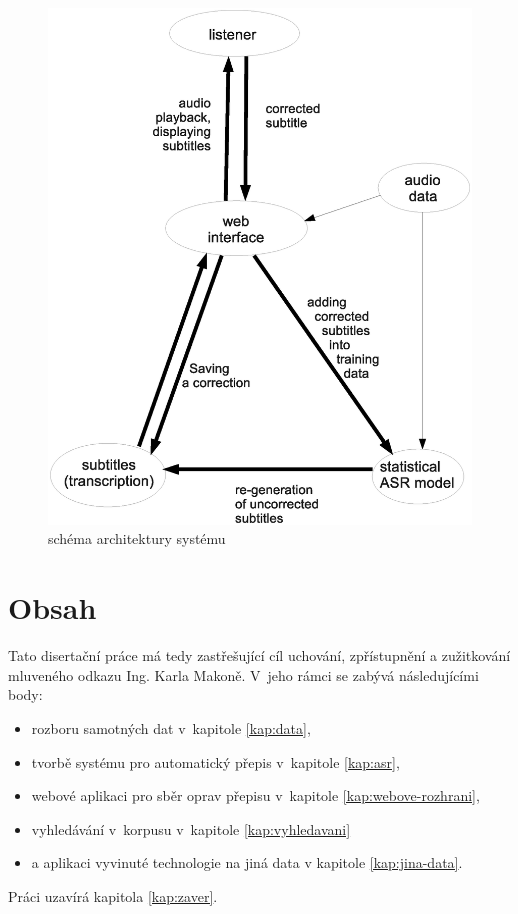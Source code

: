 \begin{figure}[htpb]
\includegraphics[scale=0.6]{rc/arch.eps}
\caption{schéma architektury systému}
\label{fig:arch}
\end{figure}

\section{Obsah}

Tato disertační práce má tedy zastřešující cíl uchování, zpřístupnění a
zužitkování mluveného odkazu Ing. Karla Makoně. V~jeho rámci se zabývá
následujícími body:

\begin{itemize}
\item{rozboru samotných dat v~kapitole \ref{kap:data},}
\item{tvorbě systému pro automatický přepis v~kapitole \ref{kap:asr},}
\item{webové aplikaci pro sběr oprav přepisu v~kapitole \ref{kap:webove-rozhrani},}
\item{vyhledávání v~korpusu v~kapitole \ref{kap:vyhledavani}}
\item{a aplikaci vyvinuté technologie na jiná data v kapitole \ref{kap:jina-data}.}
\end{itemize}

Práci uzavírá kapitola \ref{kap:zaver}.
